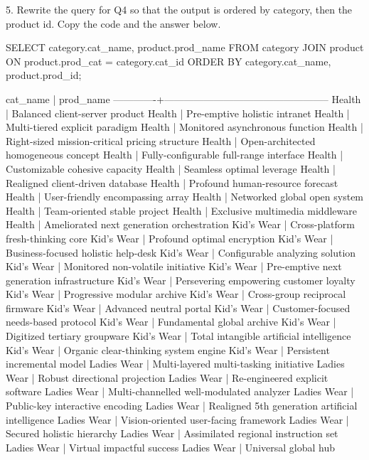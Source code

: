 5. Rewrite the query for Q4 so that the output is ordered by category, then the product id. Copy the code and the answer below.
\begin{sql}
SELECT category.cat_name, product.prod_name FROM category
JOIN product ON product.prod_cat = category.cat_id
ORDER BY category.cat_name, product.prod_id;
\end{sql}
\begin{pseudo*}
  cat_name   |                    prod_name
-------------+--------------------------------------------------
 Health      | Balanced client-server product
 Health      | Pre-emptive holistic intranet
 Health      | Multi-tiered explicit paradigm
 Health      | Monitored asynchronous function
 Health      | Right-sized mission-critical pricing structure
 Health      | Open-architected homogeneous concept
 Health      | Fully-configurable full-range interface
 Health      | Customizable cohesive capacity
 Health      | Seamless optimal leverage
 Health      | Realigned client-driven database
 Health      | Profound human-resource forecast
 Health      | User-friendly encompassing array
 Health      | Networked global open system
 Health      | Team-oriented stable project
 Health      | Exclusive multimedia middleware
 Health      | Ameliorated next generation orchestration
 Kid's Wear  | Cross-platform fresh-thinking core
 Kid's Wear  | Profound optimal encryption
 Kid's Wear  | Business-focused holistic help-desk
 Kid's Wear  | Configurable analyzing solution
 Kid's Wear  | Monitored non-volatile initiative
 Kid's Wear  | Pre-emptive next generation infrastructure
 Kid's Wear  | Persevering empowering customer loyalty
 Kid's Wear  | Progressive modular archive
 Kid's Wear  | Cross-group reciprocal firmware
 Kid's Wear  | Advanced neutral portal
 Kid's Wear  | Customer-focused needs-based protocol
 Kid's Wear  | Fundamental global archive
 Kid's Wear  | Digitized tertiary groupware
 Kid's Wear  | Total intangible artificial intelligence
 Kid's Wear  | Organic clear-thinking system engine
 Kid's Wear  | Persistent incremental model
 Ladies Wear | Multi-layered multi-tasking initiative
 Ladies Wear | Robust directional projection
 Ladies Wear | Re-engineered explicit software
 Ladies Wear | Multi-channelled well-modulated analyzer
 Ladies Wear | Public-key interactive encoding
 Ladies Wear | Realigned 5th generation artificial intelligence
 Ladies Wear | Vision-oriented user-facing framework
 Ladies Wear | Secured holistic hierarchy
 Ladies Wear | Assimilated regional instruction set
 Ladies Wear | Virtual impactful success
 Ladies Wear | Universal global hub

\end{pseudo*}
